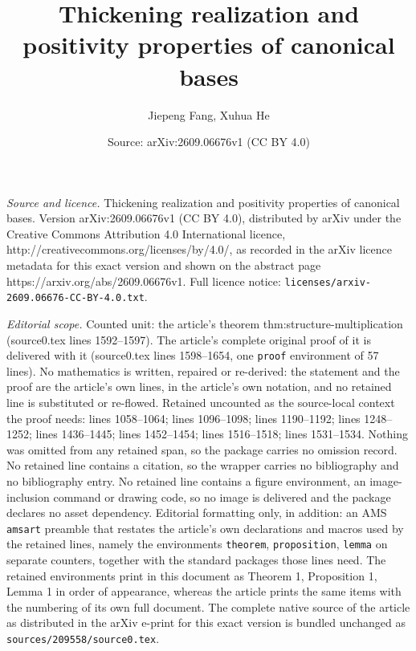 \documentclass[10pt,a4paper]{amsart}
\title{Thickening realization and positivity properties of canonical bases}
\author{Jiepeng Fang, Xuhua He}
\date{Source: arXiv:2609.06676v1 (CC BY 4.0)}
\begin{document}
\maketitle

\noindent\emph{Source and licence.} Thickening realization and positivity properties of canonical bases. Version arXiv:2609.06676v1 (CC BY 4.0), distributed by arXiv under the Creative Commons Attribution 4.0 International licence, http://creativecommons.org/licenses/by/4.0/, as recorded in the arXiv licence metadata for this exact version and shown on the abstract page https://arxiv.org/abs/2609.06676v1. Full licence notice: \texttt{licenses/arxiv-2609.06676-CC-BY-4.0.txt}.\par\smallskip

\noindent\textit{Editorial scope.} Counted unit: the article's theorem thm:structure-multiplication (source0.tex lines 1592--1597). The article's complete original proof of it is delivered with it (source0.tex lines 1598--1654, one \texttt{proof} environment of 57 lines). No mathematics is written, repaired or re-derived: the statement and the proof are the article's own lines, in the article's own notation, and no retained line is substituted or re-flowed.  Retained uncounted as the source-local context the proof needs: lines 1058--1064; lines 1096--1098; lines 1190--1192; lines 1248--1252; lines 1436--1445; lines 1452--1454; lines 1516--1518; lines 1531--1534.  Nothing was omitted from any retained span, so the package carries no omission record.  No retained line contains a citation, so the wrapper carries no bibliography and no bibliography entry.  No retained line contains a figure environment, an image-inclusion command or drawing code, so no image is delivered and the package declares no asset dependency.  Editorial formatting only, in addition: an AMS \texttt{amsart} preamble that restates the article's own declarations and macros used by the retained lines, namely the environments \texttt{theorem}, \texttt{proposition}, \texttt{lemma} on separate counters, together with the standard packages those lines need.  The retained environments print in this document as Theorem 1, Proposition 1, Lemma 1 in order of appearance, whereas the article prints the same items with the numbering of its own full document.  The complete native source of the article as distributed in the arXiv e-print for this exact version is bundled unchanged as \texttt{sources/209558/source0.tex}.
\end{document}

